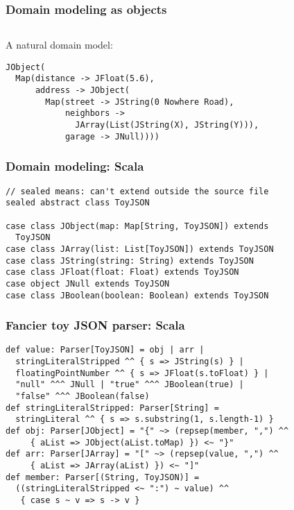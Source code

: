 \begin{frame}[fragile]
  \frametitle{Domain modeling as objects}

  \inputminted{json}{javascript/example.json}

  A natural domain model:
  \begin{verbatim}
JObject(
  Map(distance -> JFloat(5.6),
      address -> JObject(
        Map(street -> JString(0 Nowhere Road),
            neighbors ->
              JArray(List(JString(X), JString(Y))),
            garage -> JNull))))
  \end{verbatim}
\end{frame}

\begin{frame}[fragile]
  \frametitle{Domain modeling: Scala}

  \begin{verbatim}
// sealed means: can't extend outside the source file
sealed abstract class ToyJSON

case class JObject(map: Map[String, ToyJSON]) extends
  ToyJSON
case class JArray(list: List[ToyJSON]) extends ToyJSON
case class JString(string: String) extends ToyJSON
case class JFloat(float: Float) extends ToyJSON
case object JNull extends ToyJSON
case class JBoolean(boolean: Boolean) extends ToyJSON
  \end{verbatim}
\end{frame}

\begin{frame}[fragile]
  \frametitle{Fancier toy JSON parser: Scala}

  \begin{verbatim}
def value: Parser[ToyJSON] = obj | arr |
  stringLiteralStripped ^^ { s => JString(s) } |
  floatingPointNumber ^^ { s => JFloat(s.toFloat) } |
  "null" ^^^ JNull | "true" ^^^ JBoolean(true) |
  "false" ^^^ JBoolean(false)
def stringLiteralStripped: Parser[String] =
  stringLiteral ^^ { s => s.substring(1, s.length-1) }
def obj: Parser[JObject] = "{" ~> (repsep(member, ",") ^^
     { aList => JObject(aList.toMap) }) <~ "}"
def arr: Parser[JArray] = "[" ~> (repsep(value, ",") ^^
     { aList => JArray(aList) }) <~ "]"
def member: Parser[(String, ToyJSON)] =
  ((stringLiteralStripped <~ ":") ~ value) ^^
   { case s ~ v => s -> v }
  \end{verbatim}
\end{frame}

%

